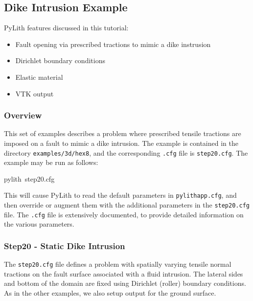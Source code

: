 
\subsection{\label{sec:example:3dhex8-dike}Dike Intrusion Example}

PyLith features discussed in this tutorial:
\begin{itemize}
\item Fault opening via prescribed tractions to mimic a dike instrusion
\item Dirichlet boundary conditions
\item Elastic material
\item VTK output
\end{itemize}

\subsubsection{Overview}

This set of examples describes a problem where prescribed tensile
tractions are imposed on a fault to mimic a dike intrusion. The example
is contained in the directory \texttt{examples/3d/hex8}, and the corresponding
\texttt{.cfg} file is \texttt{step20.cfg}. The example may be run
as follows:
\begin{lyxcode}
pylith~step20.cfg
\end{lyxcode}
This will cause PyLith to read the default parameters in \texttt{pylithapp.cfg},
and then override or augment them with the additional parameters in
the \texttt{step20.cfg} file. The \texttt{.cfg} file is extensively
documented, to provide detailed information on the various parameters.


\subsubsection{Step20 - Static Dike Intrusion}

The \texttt{step20.cfg} file defines a problem with spatially varying
tensile normal tractions on the fault surface associated with a fluid
intrusion. The lateral sides and bottom of the domain are fixed using
Dirichlet (roller) boundary conditions. As in the other examples,
we also setup output for the ground surface.

